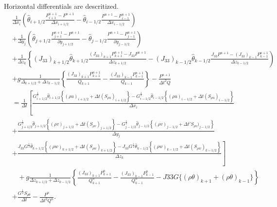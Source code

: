 Horizontal differentials are descritized.
\begin{align}
  & \frac{1}{\Delta x_i}\left(
   \hat{\theta}_{i+1/2}\frac{P^{n+1}_{i+1}-P^{n+1}}{\Delta x_{i+1/2}}
  -\hat{\theta}_{i-1/2}\frac{P^{n+1}-P^{n+1}_{i-1}}{\Delta x_{i-1/2}}
  \right) \nonumber\\&
  + \frac{1}{\Delta y_j}\left(
   \hat{\theta}_{j+1/2}\frac{P^{n+1}_{j+1}-P^{n+1}}{\partial y_{j+1/2}}
  -\hat{\theta}_{j-1/2}\frac{P^{n+1}-P^{n+1}_{j-1}}{\partial y_{j-1/2}}
 \right) \nonumber\\&
  + \frac{1}{\Delta z_k}\left\{
   (J_{33})_{k+1/2}\hat{\theta}_{k+1/2}\frac{(J_{33})_{k+1}P^{n+1}_{k+1}-J_{33}P^{n+1}}{\Delta z_{k+1/2}}
  -(J_{33})_{k-1/2}\hat{\theta}_{k-1/2}\frac{J_{33}P^{n+1}-(J_{33})_{k-1}P^{n+1}_{k-1}}{\Delta z_{k-1/2}}
  \right) \nonumber\\&
  + g \frac{1}{\Delta_{k+1/2}+\Delta z_{k-1/2}} \left\{
   \frac{(J_{33})_{k+1}P^{n+1}_{k+1}}{Q_{k+1}}
  -\frac{(J_{33})_{k-1}P^{n+1}_{k-1}}{Q_{k-1}} \right\}
  - \frac{P^{n+1}}{\Delta t^2 Q} \nonumber\\
  &=
  \frac{1}{\Delta t}\left[
      \frac{
         G^{\frac{1}{2}}_{i+1/2}\hat{\theta}_{i+1/2}\left\{(\rho u)_{i+1/2} + \Delta t (S_{\rho u})_{i+1/2}\right\}
        -G^{\frac{1}{2}}_{i-1/2}\hat{\theta}_{i-1/2}\left\{(\rho u)_{i-1/2} + \Delta t (S_{\rho u})_{i-1/2}\right\}
      }{\Delta x_i} \right.\nonumber\\&
    + \frac{
        G^{\frac{1}{2}}_{j+1/2}\hat{\theta}_{j+1/2}\left\{(\rho v)_{j+1/2} + \Delta t (S_{\rho v})_{j+1/2}\right\}
       -G^{\frac{1}{2}}_{j-1/2}\hat{\theta}_{j-1/2}\left\{(\rho v)_{j-1/2} + \Delta t 'S_{\rho v})_{j-1/2}\right\}
      }{\Delta y_j} \nonumber\\& \left.
    + \frac{
        J_{33}G^{\frac{1}{2}}\hat{\theta}_{k+1/2}\left\{(\rho w)_{k+1/2} + \Delta t (S_{\rho w})_{k+1/2}\right\}
       -J_{33}G^{\frac{1}{2}}\hat{\theta}_{k-1/2}\left\{(\rho w)_{k-1/2} + \Delta t (S_{\rho w})_{k-1/2}\right\}
      }{\Delta z_k}
    \right] \nonumber\\&\;\;\;
  + g \frac{1}{\Delta z_{k+1/2}+\Delta z_{k-1/2}}\left\{
    \frac{(J_{33})_{k+1}P^n_{k+1}}{Q^n_{k+1}}
   -\frac{(J_{33})_{k-1}P^n_{k-1}}{Q^n_{k-1}}
   - J33G \{(\rho\theta)_{k+1} + (\rho\theta)_{k-1}\}
  \right\} \nonumber\\&
  + \frac{G^{\frac{1}{2}} S_{\rho\theta}}{\Delta t}
  - \frac{P^n}{\Delta t^2 Q^n}.
\end{align}
